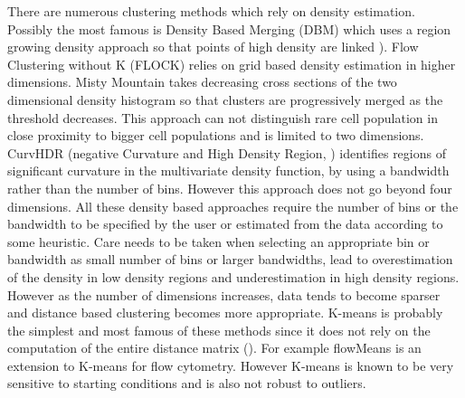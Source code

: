There are numerous clustering methods which rely on density estimation.
Possibly the most famous is Density Based Merging (DBM) which uses a region growing density approach so that points of high density are linked \cite{Walther:2009gn}).
Flow Clustering without K (FLOCK) \citep{Qian:2010ep} relies on grid based density estimation in higher dimensions.
Misty Mountain \citep{Sugar:2010jf} takes decreasing cross sections of the two dimensional density histogram so that clusters are progressively merged as the threshold decreases.
This approach can not distinguish rare cell population in close proximity to bigger cell populations and is limited to two dimensions.
CurvHDR (negative Curvature and High Density Region, \citet{Naumann:2010fp}) identifies regions of significant curvature in the multivariate density function,
by using a bandwidth rather than the number of bins.
However this approach does not go beyond four dimensions.
All these density based approaches require the number of bins or the bandwidth to be specified by the user or estimated from the data according to some heuristic.
Care needs to be taken when selecting an appropriate bin or bandwidth as small number of bins or larger bandwidths,
lead to overestimation of the density in low density regions and underestimation in high density regions.
However as the number of dimensions increases, data tends to become sparser and distance based clustering becomes more appropriate.
K-means is probably the simplest and most famous of these methods
since it does not rely on the computation of the entire distance matrix ().
For example flowMeans \citep{Aghaeepour:2010fv} is an extension to K-means for flow cytometry.
However K-means is known to be very sensitive to starting conditions and is also not robust to outliers.
